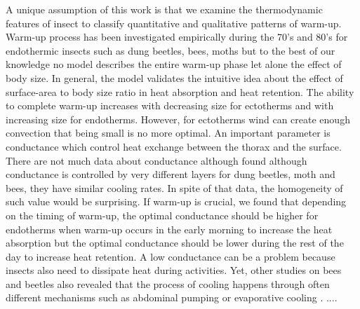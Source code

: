 A unique assumption of this work is that we examine the thermodynamic features of insect to classify quantitative and qualitative patterns of warm-up.
Warm-up process has been investigated empirically during the 70's and 80's for endothermic insects  such as dung beetles, bees, moths \citep{Heinrich1975, Bartholomew1978, Bartholomew1981} but to the best of our knowledge no model describes the entire warm-up phase let alone the effect of body size.
In general, the model validates the intuitive idea about  the effect of surface-area to body size ratio in heat absorption and heat retention.
The ability to complete warm-up increases with decreasing size for ectotherms and with increasing size for endotherms.
However, for ectotherms wind can create enough convection that being small is no more optimal.
An important parameter is conductance which control heat exchange between the thorax and the surface.
There are not much data about conductance although  \citet{Bartholomew1978} found although conductance is controlled by very different layers for dung beetles, moth and bees, they have similar cooling rates. %
In spite of that data, the homogeneity of such value would be surprising. %
If warm-up is crucial, we found that depending on the timing of warm-up, the optimal conductance should be higher for endotherms when warm-up occurs in the early morning  to increase the heat absorption but the optimal conductance should be lower during the rest of the day to increase heat retention.
A low conductance  can be a problem because insects also need to dissipate heat during activities.
Yet,  other studies on bees and beetles also revealed that the process of cooling happens through often different mechanisms such as abdominal pumping or evaporative cooling \citep{Heinrich1979, Verdu2012}.
....

